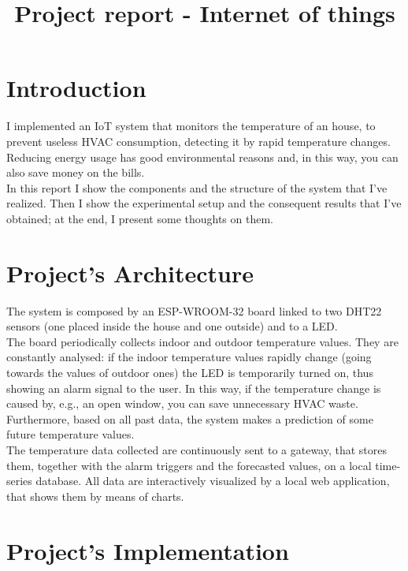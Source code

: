 \documentclass[conference]{IEEEtran}
\begin{document}
\title{Project report - Internet of things}

\author{
}

\maketitle


\section{Introduction}
I implemented an IoT system that monitors the temperature of an house, to prevent useless HVAC consumption, detecting it by rapid temperature changes. Reducing energy usage has good environmental reasons and, in this way, you can also save money on the bills.\\
In this report I show the components and the structure of the system that I've realized. Then I show the experimental setup and the consequent results that I've obtained; at the end, I present some thoughts on them.


\section{Project’s Architecture}
The system is composed by an ESP-WROOM-32 board linked to two DHT22 sensors (one placed inside the house and one outside) and to a LED.\\
The board periodically collects indoor and outdoor temperature values. They are constantly analysed: if the indoor temperature values rapidly change (going towards the values of outdoor ones) the LED is temporarily turned on, thus showing an alarm signal to the user. In this way, if the temperature change is caused by, e.g., an open window, you can save unnecessary HVAC waste. Furthermore, based on all past data, the system makes a prediction of some future temperature values.\\
The temperature data collected are continuously sent to a gateway, that stores them, together with the alarm triggers and the forecasted values, on a local time-series database. All data are interactively visualized by a local web application, that shows them by means of charts.


\section{Project’s Implementation}
\end{document}
